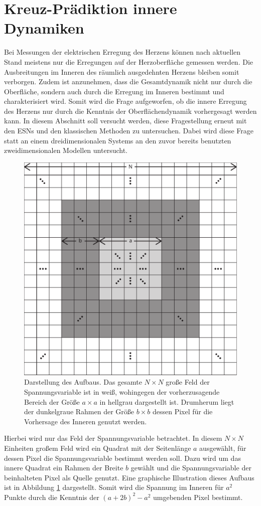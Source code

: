 \section{Kreuz-Prädiktion innere Dynamiken}
\label{sec:exp_inner_prediction}
Bei Messungen der elektrischen Erregung des Herzens können nach aktuellen Stand meistens nur die Erregungen auf der Herzoberfläche gemessen werden. Die Ausbreitungen im Inneren des räumlich ausgedehnten Herzens bleiben somit verborgen. Zudem ist anzunehmen, dass die Gesamtdynamik nicht nur durch die Oberfläche, sondern auch durch die Erregung im Inneren bestimmt und charakterisiert wird. Somit wird die Frage aufgeworfen, ob die innere Erregung des Herzens nur durch die Kenntnis der Oberflächendynamik vorhergesagt werden kann. In diesem Abschnitt soll versucht werden, diese Fragestellung erneut mit den \textsc{ESN}s und den klassischen Methoden zu untersuchen. Dabei wird diese Frage statt an einem dreidimensionalen Systems an den zuvor bereits benutzten zweidimensionalen Modellen untersucht.\\

\begin{figure}[h]
	\centering
	\includegraphics[width=.4\linewidth]{figures/illustrations/inner_prediction.pdf}
	\caption{Darstellung des Aufbaus. Das gesamte $N \times N$ große Feld der Spannungsvariable ist in weiß, wohingegen der vorherzusagende Bereich der Größe $a \times a$ in hellgrau dargestellt ist. Drumherum liegt der dunkelgraue Rahmen der Größe $b \times b$ dessen Pixel für die Vorhersage des Inneren genutzt werden.}
	\label{fig:exp_inner_prediction}
\end{figure}

Hierbei wird nur das Feld der Spannungsvariable betrachtet. In diesem $N \times N$ Einheiten großem Feld wird ein Quadrat mit der Seitenlänge $a$ ausgewählt, für dessen Pixel die Spannungsvariable bestimmt werden soll. Dazu wird um das innere Quadrat ein Rahmen der Breite $b$ gewählt und die Spannungsvariable der beinhalteten Pixel als Quelle genutzt. Eine graphische Illustration dieses Aufbaus ist in Abbildung \ref{fig:exp_inner_prediction} dargestellt. Somit wird die Spannung im Inneren für $a^2$ Punkte durch die Kenntnis der $(a+2b)^2-a^2$ umgebenden Pixel bestimmt.\\

